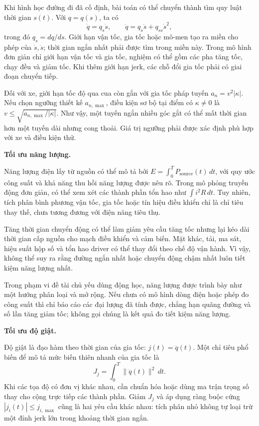 \documentclass[12pt,a4paper,oneside]{report}
\begin{document}
Khi hình học đường đi đã cố định, bài toán có thể chuyển thành tìm quy luật thời gian \(s(t)\). Với \(q=q(s)\), ta có
\[
  \dot q=q_s\dot s,\qquad
  \ddot q=q_s\ddot s+q_{ss}\dot s^2,
\]
trong đó \(q_s=dq/ds\). Giới hạn vận tốc, gia tốc hoặc mô-men tạo ra miền cho phép của \(\dot s,\ddot s\); thời gian ngắn nhất phải được tìm trong miền này. Trong mô hình đơn giản chỉ giới hạn vận tốc và gia tốc, nghiệm có thể gồm các pha tăng tốc, chạy đều và giảm tốc. Khi thêm giới hạn jerk, các chỗ đổi gia tốc phải có giai đoạn chuyển tiếp.

Đối với xe, giới hạn tốc độ qua cua còn gắn với gia tốc pháp tuyến \(a_n=v^2|\kappa|\). Nếu chọn ngưỡng thiết kế \(a_{n,\max}\), điều kiện sơ bộ tại điểm có \(\kappa\neq0\) là \(v\leq\sqrt{a_{n,\max}/|\kappa|}\). Như vậy, một tuyến ngắn nhiều góc gắt có thể mất thời gian hơn một tuyến dài nhưng cong thoải. Giá trị ngưỡng phải được xác định phù hợp với xe và điều kiện thử.

\noindent\textbf{Tối ưu năng lượng.}

Năng lượng điện lấy từ nguồn có thể mô tả bởi \(E=\int_0^T P_{\mathrm{source}}(t)\,dt\), với quy ước công suất và khả năng thu hồi năng lượng được nêu rõ. Trong mô phỏng truyền động đơn giản, có thể xem xét các thành phần tổn hao như \(\int i^2R\,dt\). Tuy nhiên, tích phân bình phương vận tốc, gia tốc hoặc tín hiệu điều khiển chỉ là chỉ tiêu thay thế, chưa tương đương với điện năng tiêu thụ.

Tăng thời gian chuyển động có thể làm giảm yêu cầu tăng tốc nhưng lại kéo dài thời gian cấp nguồn cho mạch điều khiển và cảm biến. Mặt khác, tải, ma sát, hiệu suất hộp số và tổn hao driver có thể thay đổi theo chế độ vận hành. Vì vậy, không thể suy ra rằng đường ngắn nhất hoặc chuyển động chậm nhất luôn tiết kiệm năng lượng nhất.

Trong phạm vi đề tài chủ yếu dùng động học, năng lượng được trình bày như một hướng phân loại và mở rộng. Nếu chưa có mô hình dòng điện hoặc phép đo công suất thì chỉ báo cáo các đại lượng đã tính được, chẳng hạn quãng đường và số lần tăng giảm tốc; không gọi chúng là kết quả đo tiết kiệm năng lượng.

\noindent\textbf{Tối ưu độ giật.}

Độ giật là đạo hàm theo thời gian của gia tốc: \(j(t)=\dddot q(t)\). Một chỉ tiêu phổ biến để mô tả mức biến thiên nhanh của gia tốc là
\[
  J_j=\int_0^T \|\dddot q(t)\|^2\,dt.
\]
Khi các tọa độ có đơn vị khác nhau, cần chuẩn hóa hoặc dùng ma trận trọng số thay cho cộng trực tiếp các thành phần. Giảm \(J_j\) và áp dụng ràng buộc cứng \(|j_i(t)|\leq j_{i,\max}\) cũng là hai yêu cầu khác nhau: tích phân nhỏ không tự loại trừ một đỉnh jerk lớn trong khoảng thời gian ngắn.
\end{document}
